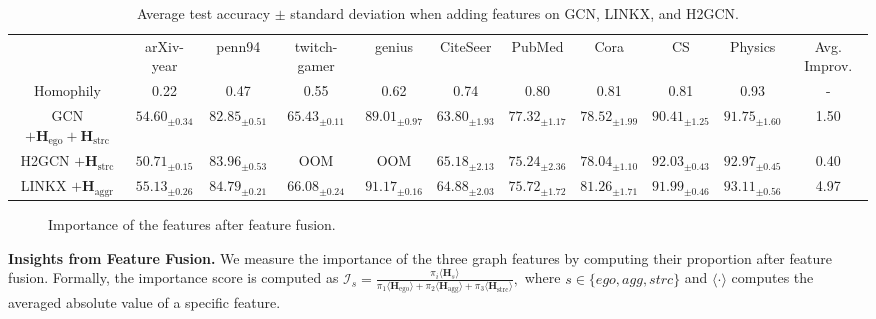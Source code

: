 \documentclass{article}
\theoremstyle{plain}
\begin{document}
\begin{table*}[t]
\centering
\caption{Average test accuracy $\pm$ standard deviation when adding features on GCN, LINKX, and H2GCN.}
\label{tab:addfeature}
\scriptsize
\tabcolsep=0.01cm
\begin{tabular}{c|ccccccccc|c}
\toprule
      & arXiv-year       & penn94       & twitch-gamer     & genius       & CiteSeer     & PubMed       & Cora     & CS     & Physics     & Avg. Improv.  \\
Homophily & 0.22     & 0.47     & 0.55     & 0.62     & 0.74     & 0.80     & 0.81     & 0.81     & 0.93     & -      \\
\midrule
\midrule
GCN $+\mathbf{H}_\text{ego}+\mathbf{H}_\text{strc}$      & $54.60_{\pm 0.34}$    & $82.85_{\pm 0.51}$    & $65.43_{\pm 0.11}$    & $89.01_{\pm 0.97}$    & $63.80_{\pm 1.93}$    & $77.32_{\pm 1.17}$    & $78.52_{\pm 1.99}$    & $90.41_{\pm 1.25}$    & $91.75_{\pm 1.60}$    &  1.50   \\
H2GCN $+\mathbf{H}_\text{strc}$    & $50.71_{\pm 0.15}$    & $83.96_{\pm 0.53}$    & OOM      & OOM      & $65.18_{\pm 2.13}$    & $75.24_{\pm 2.36}$    & $78.04_{\pm 1.10}$    & $92.03_{\pm 0.43}$    &  $92.97_{\pm 0.45}$    &     0.40 \\
LINKX $+\mathbf{H}_\text{aggr}$    & $55.13_{\pm 0.26}$ & $84.79_{\pm 0.21}$ & $66.08_{\pm 0.24}$ & $91.17_{\pm 0.16}$ & $64.88_{\pm 2.03}$    & $75.72_{\pm 1.72}$    & $81.26_{\pm 1.71}$    & $91.99_{\pm 0.46}$    & $93.11_{\pm0.56}$    &  4.97\\  
\bottomrule
\end{tabular}
\vspace{-10pt}
\end{table*}

\begin{figure}[!htb]
\centering
{}
\vspace{-10pt}
\caption{Importance of the features after feature fusion.}
\label{fig:feature_proportion}
\end{figure}

\textbf{Insights from Feature Fusion.} \label{sec:FusionAnalysis}
We measure the importance of the three graph features by computing their proportion after feature fusion. Formally, the importance score is computed as
 $\mathcal{I}_{s} = \frac{\pi_{i} \langle \mathbf{H}_{s} \rangle}{\pi_1 \langle \mathbf{H}_\text{ego} \rangle + \pi_2 \langle \mathbf{H}_\text{agg} \rangle + \pi_3 \langle \mathbf{H}_\text{strc} \rangle},
$
where $s \in \{ego,agg,strc\}$ and $\langle \cdot \rangle$ computes the averaged absolute value of a specific feature.
\end{document}
